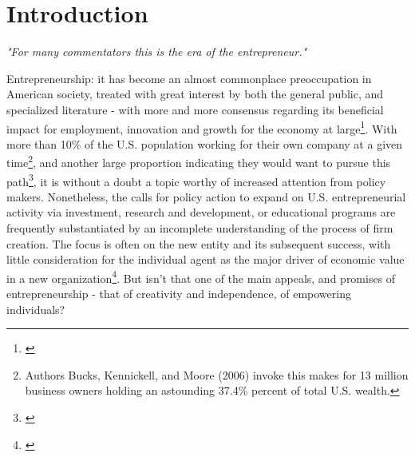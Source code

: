\chapter{Introduction\label{ch:intro}}

\begin{flushright}
    \textit{"For many commentators this is the era of the entrepreneur." } \\
    [Robert Goffee and Richard Scase, (1987)]
\end{flushright}


Entrepreneurship: it has become an almost commonplace preoccupation in American society, treated with great interest by both the general public, and specialized literature - with more and more consensus regarding its beneficial impact for employment, innovation and growth for the economy at large\footnote{\cite{ReynoldsWhite1997}}. With more than 10\% of the U.S. population working for their own company at a given time\footnote{Authors Bucks, Kennickell, and Moore (2006) invoke this makes for 13 million business owners holding an astounding 37.4\% percent of total U.S. wealth. }, and another large proportion indicating they would want to pursue this path\footnote{\cite{kennickell2006currents}}, it is without a doubt a topic worthy of increased attention from policy makers. Nonetheless, the calls for policy action to expand on U.S. entrepreneurial activity via investment, research and development, or educational programs are frequently substantiated by an incomplete understanding of the process of  firm creation.  The focus is often on the new entity and its subsequent success, with little consideration for the individual agent as the major driver of economic value in a new organization\footnote{\cite{BlanchflowerOswald1998}}. But isn’t that one of the main appeals, and promises of entrepreneurship - that of creativity and independence, of empowering individuals?


